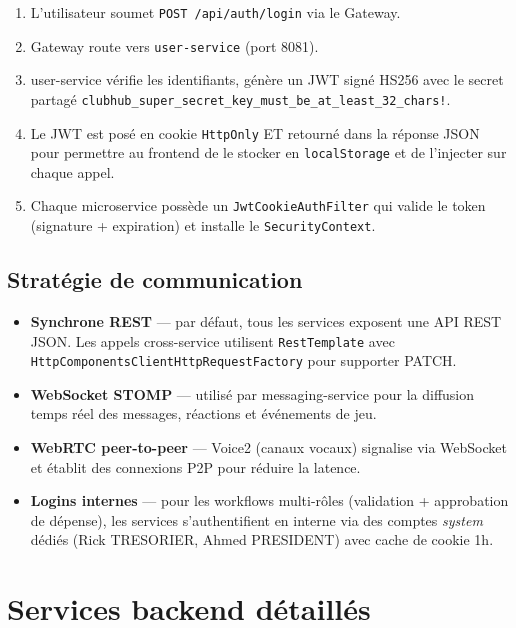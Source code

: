 \documentclass[11pt,a4paper]{report}
\begin{document}
\begin{enumerate}[leftmargin=*]
  \item L'utilisateur soumet \texttt{POST /api/auth/login} via le Gateway.
  \item Gateway route vers \texttt{user-service} (port 8081).
  \item user-service vérifie les identifiants, génère un JWT signé HS256 avec
        le secret partagé \texttt{clubhub\_super\_secret\_key\_must\_be\_at\_least\_32\_chars!}.
  \item Le JWT est posé en cookie \texttt{HttpOnly} ET retourné dans la réponse
        JSON pour permettre au frontend de le stocker en \texttt{localStorage}
        et de l'injecter sur chaque appel.
  \item Chaque microservice possède un \texttt{JwtCookieAuthFilter} qui valide
        le token (signature + expiration) et installe le \texttt{SecurityContext}.
\end{enumerate}

\section{Stratégie de communication}

\begin{itemize}[leftmargin=*]
  \item \textbf{Synchrone REST} — par défaut, tous les services exposent une API
        REST JSON. Les appels cross-service utilisent \texttt{RestTemplate} avec
        \texttt{HttpComponentsClientHttpRequestFactory} pour supporter PATCH.
  \item \textbf{WebSocket STOMP} — utilisé par messaging-service pour la
        diffusion temps réel des messages, réactions et événements de jeu.
  \item \textbf{WebRTC peer-to-peer} — Voice2 (canaux vocaux) signalise via
        WebSocket et établit des connexions P2P pour réduire la latence.
  \item \textbf{Logins internes} — pour les workflows multi-rôles (validation
        + approbation de dépense), les services s'authentifient en interne via
        des comptes \textit{system} dédiés (Rick TRESORIER, Ahmed PRESIDENT)
        avec cache de cookie 1h.
\end{itemize}


\chapter{Services backend détaillés}
\end{document}
